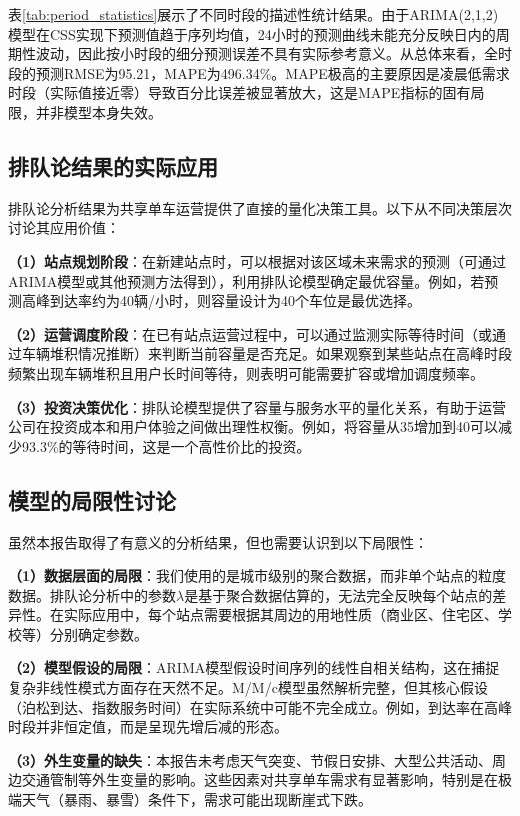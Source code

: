 \documentclass[12pt,a4paper]{article}
\begin{document}
表\ref{tab:period_statistics}展示了不同时段的描述性统计结果。由于ARIMA(2,1,2)模型在CSS实现下预测值趋于序列均值，24小时的预测曲线未能充分反映日内的周期性波动，因此按小时段的细分预测误差不具有实际参考意义。从总体来看，全时段的预测RMSE为95.21，MAPE为496.34\%。MAPE极高的主要原因是凌晨低需求时段（实际值接近零）导致百分比误差被显著放大，这是MAPE指标的固有局限，并非模型本身失效。

\subsection{排队论结果的实际应用}

排队论分析结果为共享单车运营提供了直接的量化决策工具。以下从不同决策层次讨论其应用价值：

\textbf{（1）站点规划阶段}：在新建站点时，可以根据对该区域未来需求的预测（可通过ARIMA模型或其他预测方法得到），利用排队论模型确定最优容量。例如，若预测高峰到达率约为40辆/小时，则容量设计为40个车位是最优选择。

\textbf{（2）运营调度阶段}：在已有站点运营过程中，可以通过监测实际等待时间（或通过车辆堆积情况推断）来判断当前容量是否充足。如果观察到某些站点在高峰时段频繁出现车辆堆积且用户长时间等待，则表明可能需要扩容或增加调度频率。

\textbf{（3）投资决策优化}：排队论模型提供了容量与服务水平的量化关系，有助于运营公司在投资成本和用户体验之间做出理性权衡。例如，将容量从35增加到40可以减少93.3\%的等待时间，这是一个高性价比的投资。

\subsection{模型的局限性讨论}

虽然本报告取得了有意义的分析结果，但也需要认识到以下局限性：

\textbf{（1）数据层面的局限}：我们使用的是城市级别的聚合数据，而非单个站点的粒度数据。排队论分析中的参数$\lambda$是基于聚合数据估算的，无法完全反映每个站点的差异性。在实际应用中，每个站点需要根据其周边的用地性质（商业区、住宅区、学校等）分别确定参数。

\textbf{（2）模型假设的局限}：ARIMA模型假设时间序列的线性自相关结构，这在捕捉复杂非线性模式方面存在天然不足。M/M/c模型虽然解析完整，但其核心假设（泊松到达、指数服务时间）在实际系统中可能不完全成立。例如，到达率在高峰时段并非恒定值，而是呈现先增后减的形态。

\textbf{（3）外生变量的缺失}：本报告未考虑天气突变、节假日安排、大型公共活动、周边交通管制等外生变量的影响。这些因素对共享单车需求有显著影响，特别是在极端天气（暴雨、暴雪）条件下，需求可能出现断崖式下跌。
\end{document}
